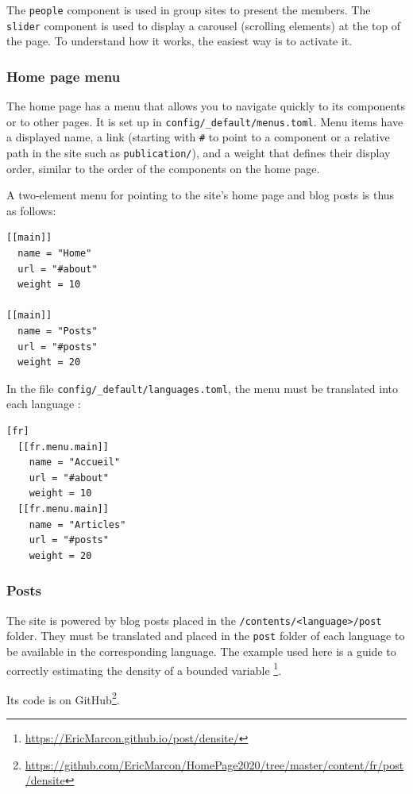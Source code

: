 \documentclass[
  12pt,
  american,
  a4paper,
  extrafontsizes,onecolumn,openright
  ]{memoir}
\begin{document}
The \texttt{people} component is used in group sites to present the members.
The \texttt{slider} component is used to display a carousel (scrolling elements) at the top of the page.
To understand how it works, the easiest way is to activate it.

\subsubsection{Home page menu}\label{home-page-menu}

The home page has a menu that allows you to navigate quickly to its components or to other pages.
It is set up in \texttt{config/\_default/menus.toml}.
Menu items have a displayed name, a link (starting with \texttt{\#} to point to a component or a relative path in the site such as \texttt{publication/}), and a weight that defines their display order, similar to the order of the components on the home page.

A two-element menu for pointing to the site's home page and blog posts is thus as follows:

\begin{verbatim}
[[main]]
  name = "Home"
  url = "#about"
  weight = 10

[[main]]
  name = "Posts"
  url = "#posts"
  weight = 20
\end{verbatim}

In the file \texttt{config/\_default/languages.toml}, the menu must be translated into each language :

\begin{verbatim}
[fr]
  [[fr.menu.main]]
    name = "Accueil"
    url = "#about"
    weight = 10
  [[fr.menu.main]]
    name = "Articles"
    url = "#posts"
    weight = 20
\end{verbatim}

\subsubsection{Posts}\label{posts}

The site is powered by blog posts placed in the \texttt{/contents/\textless{}language\textgreater{}/post} folder.
They must be translated and placed in the \texttt{post} folder of each language to be available in the corresponding language.
The example used here is a guide to correctly estimating the density of a bounded variable \footnote{\url{https://EricMarcon.github.io/post/densite/}}.

Its code is on GitHub\footnote{\url{https://github.com/EricMarcon/HomePage2020/tree/master/content/fr/post/densite}}.
\end{document}
